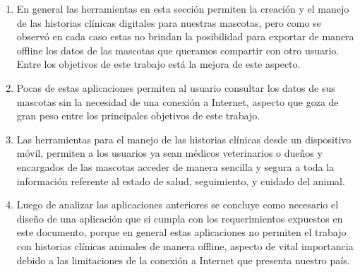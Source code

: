 \begin{enumerate}
	
	
	\item	En general las herramientas en esta sección permiten la creación y el manejo de las historias clínicas digitales para nuestras mascotas, pero como se observó en cada caso estas no brindan la posibilidad para exportar de manera offline los datos de las mascotas que queramos compartir con otro usuario. Entre los objetivos de este trabajo está la mejora de este aspecto.
	\item	Pocas de estas aplicaciones permiten al usuario consultar los datos de sus mascotas sin la necesidad de una conexión a Internet, aspecto que goza de gran peso entre los principales objetivos de este trabajo.
	\item	Las herramientas para el manejo de las historias clínicas desde un dispositivo móvil, permiten a los usuarios ya sean médicos veterinarios o dueños y encargados de las mascotas acceder de manera sencilla y segura a toda la información referente al estado de salud, seguimiento, y cuidado del animal.
	\item	Luego de analizar las aplicaciones anteriores se concluye como necesario el diseño de una aplicación que si cumpla con los requerimientos expuestos en este documento, porque en general estas aplicaciones no permiten el trabajo con historias clínicas animales de manera offline, aspecto de vital importancia debido a las limitaciones de la conexión a Internet que presenta nuestro país.
\end{enumerate}








